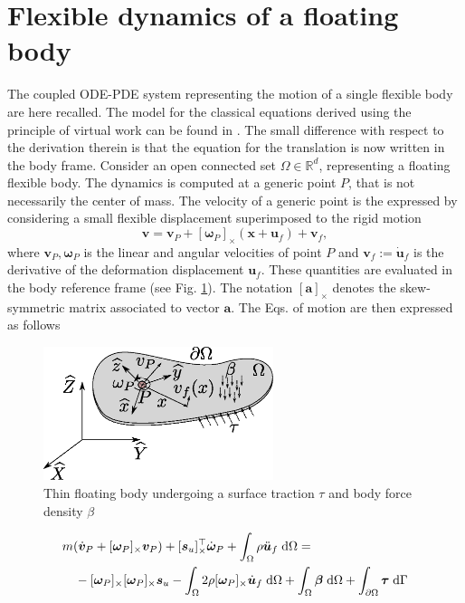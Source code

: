\documentclass{svjour3}                     %
\newcommand{\crmat}[1]{\ensuremath{[#1]_{\times}}}
\begin{document}
\section{Flexible dynamics of a floating body}
\label{sec:class_model}
The coupled ODE-PDE system representing the motion of a single flexible body are here recalled. The model for the classical equations derived using the principle of virtual work can be found in \cite{MB_Daepde}. The small difference with respect to the derivation therein is that the equation for the translation is now written in the body frame. Consider an open connected set $\Omega \in \mathbb{R}^d$, representing a floating flexible body. The dynamics is computed at a generic point $P$, that is not necessarily the center of mass. The velocity of a generic point is the expressed by considering a small flexible displacement superimposed to the rigid motion
\[
\bm{v} = \bm{v}_P + \crmat{\bm{\omega}_P} (\bm{x}+\bm{u}_f) + \bm{v}_f,
\]
where $\bm{v}_P, \bm{\omega}_P$ is the linear and angular velocities of point $P$  and $\bm{v}_f := \dot{\bm{u}}_f$ is the derivative of the deformation displacement $\bm{u}_f$. These quantities are evaluated in the body reference frame (see Fig. \ref{fig:float_body}). The notation $\crmat{\bm{a}}$ denotes the skew-symmetric matrix associated to vector $\bm{a}$. The Eqs. of motion are then expressed as follows
\begin{figure}[t]
	\centering
	\includegraphics[width=0.6\textwidth]{floating_body.eps} 
	\caption{Thin floating body undergoing a surface traction $\tau$ and body force density $\beta$}
	\label{fig:float_body}
\end{figure}

\begin{equation}
\label{eq:rig_tr1}
\begin{split}
&m (\dot{\bm{v}}_P + \crmat{\bm{\omega}_P} \bm{v}_P) + \crmat{\bm{s}_u}^\top \dot{\bm{\omega}}_P  + \int_{\Omega} \rho \ddot{\bm{u}}_f \d{\Omega} = \\
&\quad - \crmat{\bm{\omega}_P} \crmat{\bm{\omega}_P} \bm{s}_u - \int_{\Omega} 2 \rho \crmat{\bm{\omega}_P} \dot{\bm{u}}_f \d{\Omega} +  \int_{\Omega} \bm\beta \d{\Omega} + \int_{\partial \Omega} \bm\tau \d{\Gamma} 
\end{split}
\end{equation}
\end{document}
